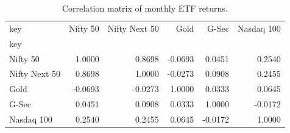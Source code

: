 \begin{table}
\caption{Correlation matrix of monthly ETF returns.}
\label{tab:T03_correlations}
\begin{tabular}{lrrrrr}
\toprule
key & Nifty 50 & Nifty Next 50 & Gold & G-Sec & Nasdaq 100 \\
key &  &  &  &  &  \\
\midrule
Nifty 50 & 1.0000 & 0.8698 & -0.0693 & 0.0451 & 0.2540 \\
Nifty Next 50 & 0.8698 & 1.0000 & -0.0273 & 0.0908 & 0.2455 \\
Gold & -0.0693 & -0.0273 & 1.0000 & 0.0333 & 0.0645 \\
G-Sec & 0.0451 & 0.0908 & 0.0333 & 1.0000 & -0.0172 \\
Nasdaq 100 & 0.2540 & 0.2455 & 0.0645 & -0.0172 & 1.0000 \\
\bottomrule
\end{tabular}
\end{table}

